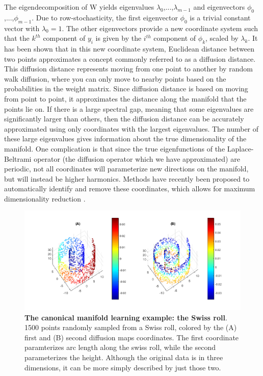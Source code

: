 \documentclass[12pt]{article}
\begin{document}
The eigendecomposition of W yields eigenvalues $\lambda _0$,...,$\lambda_{m-1}$ and eigenvectors $\phi _0$,...,$\phi_{m-1}$. Due to row-stochasticity, the first eigenvector $\phi_0$ is a trivial constant vector with $\lambda_0 = 1$. The other eigenvectors provide a new coordinate system such that the $k^{th}$ component of $y_i$ is given by the $i^{th}$ component of $\phi_k$, scaled by $\lambda_k$. It has been shown that in this new coordinate system, Euclidean distance between two points approximates a concept commonly referred to as a diffusion distance. This diffusion distance represents moving from one point to another by random walk diffusion, where you can only move to nearby points based on the probabilities in the weight matrix. Since diffusion distance is based on moving from point to point, it approximates the distance along the manifold that the points lie on. If there is a large spectral gap, meaning that some eigenvalues are significantly larger than others, then the diffusion distance can be accurately approximated using only coordinates with the largest eigenvalues.  The number of these large eigenvalues gives information about the true dimensionality of the manifold. One complication is that since the true eigenfunctions of the Laplace-Beltrami operator (the diffusion operator which we have approximated) are periodic, not all coordinates will parameterize new directions on the manifold, but will instead be higher harmonics. Methods have recently been proposed to automatically identify and remove these coordinates, which allows for maximum dimensionality reduction \cite{Dsilva2015}.

\begin{figure}[here]
\includegraphics[width=\linewidth]{figures/swissroll}
\caption{\textbf{The canonical manifold learning example: the Swiss roll}. 1500 points randomly sampled from a Swiss roll, colored by the (A) first and (B) second diffusion maps coordinates. The first coordinate paramterizes arc length along the swiss roll, while the second parameterizes the height. Although the original data is in three dimensions, it can be more simply described by just those two.}
\label{fig:sr}
\end{figure}
\end{document}
